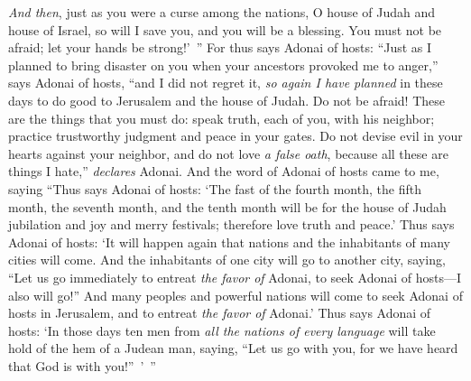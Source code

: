 \begin{biblechapter}
\verse \textit{And then}, just as you were a curse among the nations, O house of Judah and house of Israel, so will I save you, and you will be a blessing. You must not be afraid; let your hands be strong!’ ”
\verse For thus says Adonai of hosts: “Just as I planned to bring disaster on you when your ancestors provoked me to anger,” says Adonai of hosts, “and I did not regret it,
\verse \textit{so again I have planned} in these days to do good to Jerusalem and the house of Judah. Do not be afraid!
\verse These are the things that you must do: speak truth, each of you, with his neighbor; practice trustworthy judgment and peace in your gates.
\verse Do not devise evil in your hearts against your neighbor, and do not love \textit{a false oath}, because all these are things I hate,” \textit{declares} Adonai.
\verse And the word of Adonai of hosts came to me, saying
\verse “Thus says Adonai of hosts: ‘The fast of the fourth month, the fifth month, the seventh month, and the tenth month will be for the house of Judah jubilation and joy and merry festivals; therefore love truth and peace.’
\verse Thus says Adonai of hosts: ‘It will happen again that nations and the inhabitants of many cities will come.
\verse And the inhabitants of one city will go to another city, saying, “Let us go immediately to entreat \textit{the favor of} Adonai, to seek Adonai of hosts—I also will go!”
\verse And many peoples and powerful nations will come to seek Adonai of hosts in Jerusalem, and to entreat \textit{the favor of} Adonai.’
\verse Thus says Adonai of hosts: ‘In those days ten men from \textit{all the nations of every language} will take hold of the hem of a Judean man, saying, “Let us go with you, for we have heard that God is with you!” ’ ”
\end{biblechapter}

